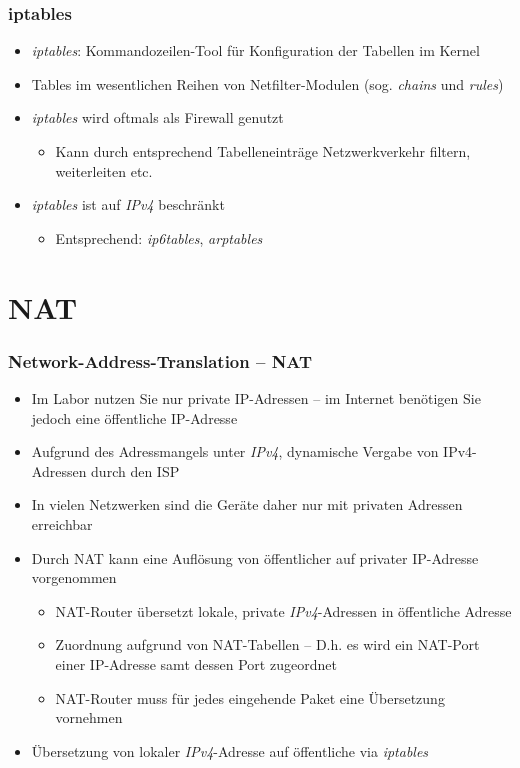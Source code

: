 \documentclass[xcolor=dvipsnames, aspectratio=169]{beamer}
\begin{document}
\begin{frame}
\frametitle{iptables}
	\begin{itemize}
		\item \emph{iptables}: Kommandozeilen-Tool für Konfiguration der Tabellen im Kernel
		\item Tables im wesentlichen Reihen von Netfilter-Modulen (sog. \emph{chains} und \emph{rules})
		\item \emph{iptables} wird oftmals als Firewall genutzt
		\begin{itemize}
			\item Kann durch entsprechend Tabelleneinträge Netzwerkverkehr filtern, weiterleiten etc.
		\end{itemize}
		\item \emph{iptables} ist auf \emph{IPv4} beschränkt
		\begin{itemize}
			\item Entsprechend: \emph{ip6tables}, \emph{arptables}
		\end{itemize}
	\end{itemize}
\end{frame}

\section{NAT}
\begin{frame}
\frametitle{Network-Address-Translation -- NAT}
\vspace*{-0.5cm}
	\begin{itemize}
		\item Im Labor nutzen Sie nur private IP-Adressen -- im Internet benötigen Sie jedoch eine öffentliche IP-Adresse
		\item Aufgrund des Adressmangels unter \emph{IPv4}, dynamische Vergabe von IPv4-Adressen durch den ISP
		\item In vielen Netzwerken sind die Geräte daher nur mit privaten Adressen erreichbar
		\item Durch NAT kann eine Auflösung von öffentlicher auf privater IP-Adresse vorgenommen
		\begin{itemize}
			\item NAT-Router übersetzt lokale, private \emph{IPv4}-Adressen in öffentliche Adresse
			\item Zuordnung aufgrund von NAT-Tabellen -- D.h. es wird ein NAT-Port einer IP-Adresse samt dessen Port zugeordnet
			\item NAT-Router muss für jedes eingehende Paket eine Übersetzung vornehmen
		\end{itemize}
		\item Übersetzung von lokaler \emph{IPv4}-Adresse auf öffentliche via \emph{iptables}
	\end{itemize}
\end{frame}
\end{document}
